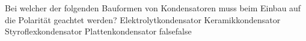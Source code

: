     {Bei welcher der folgenden Bauformen von Kondensatoren muss beim Einbau auf die Polarität geachtet werden?}
    {Elektrolytkondensator}
    {Keramikkondensator}
    {Styroflexkondensator}
    {Plattenkondensator}
    {false}{false}